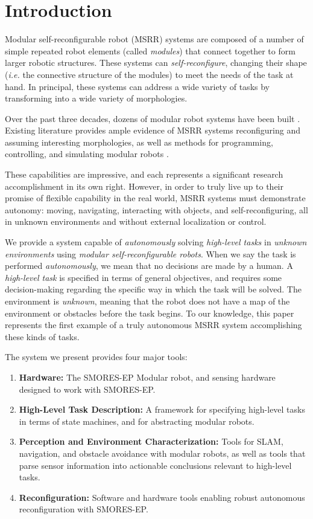 \documentclass[conference]{IEEEtran}
\begin{document}
\section{Introduction} \label{sec:introduction}
%
Modular self-reconfigurable robot (MSRR) systems are composed of a number of simple repeated robot elements (called \emph{modules}) that connect together to form larger robotic structures. These systems can \emph{self-reconfigure}, changing their shape (\emph{i.e.} the connective structure of the modules) to meet the needs of the task at hand.
In principal, these systems can address a wide variety of tasks by transforming into a wide variety of morphologies.   

Over the past three decades, dozens of modular robot systems have been built \cite{Yim2007a}. Existing literature provides ample evidence of MSRR systems reconfiguring and assuming interesting morphologies, as well as methods for programming, controlling, and simulating modular robots \cite{Yim2007,Jing2016,Yim1994}.

These capabilities are impressive, and each represents a significant research accomplishment in its own right. However, in order to truly live up to their promise of flexible capability in the real world, MSRR systems must demonstrate autonomy: moving, navigating, interacting with objects, and self-reconfiguring, all in unknown environments and without external localization or control. 

We provide a system capable of \emph{autonomously} solving \emph{high-level
tasks} in \emph{unknown environments} using \emph{modular self-reconfigurable
robots}.  When we say the task is performed \emph{autonomously}, we mean that
no decisions are made by a human. A \emph{high-level task} is specified in terms
of general objectives, and requires some decision-making regarding the specific
way in which the task will be solved. The environment is \emph{unknown}, meaning
that the robot does not have a map of the environment or obstacles before the
task begins. To our knowledge, this paper represents the first example of a truly autonomous MSRR system accomplishing these kinds of tasks.

The system we present provides four major tools:

\begin{enumerate}
\item \textbf{Hardware:} The SMORES-EP Modular robot, and sensing hardware designed
to work with SMORES-EP.  
\item \textbf{High-Level Task Description:} A framework for specifying high-level
tasks in terms of state machines, and for abstracting modular robots.
\item \textbf{Perception and Environment Characterization:} Tools for SLAM,
navigation, and obstacle avoidance with modular robots, as well as tools that
parse sensor information into actionable conclusions relevant to high-level
tasks.
\item \textbf{Reconfiguration:} Software and hardware tools enabling robust
autonomous reconfiguration with SMORES-EP.
\end{enumerate}
\end{document}
